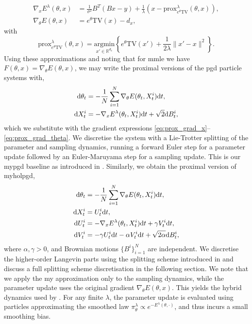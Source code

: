 \begin{align}
    \nabla_xE^\lambda(\theta,x)&=\frac{1}{\sigma^2}B^T(Bx-y)+\frac{1}{\lambda}\left(x-\mathrm{prox}^\lambda_{e^\theta\mathrm{TV}}(\theta,x)\right),\label{eq:prox_grad_x}\\
    \nabla_\theta E(\theta,x)&=e^\theta\mathrm{TV}(x)-d_x,\label{eq:prox_grad_theta}
\end{align}
with
\begin{equation*}
    \mathrm{prox}^\lambda_{e^\theta\mathrm{TV}}(\theta,x)=\underset{x'\in\mathbb{R}^{d_x}}{\mathrm{argmin}}\left\{e^\theta\mathrm{TV}(x')+\frac{1}{2\lambda}\|x'-x\|^2\right\}.
\end{equation*}
Using these approximations and noting that for \gls*{mmle} we have $F(\theta,x)=\nabla_\theta E(\theta,x)$, we may write the proximal versions of the \gls*{pgd} particle systems with,
\begin{equation*}
    \begin{aligned}
        \mathrm{d} \theta_t&=-\frac{1}{N}\sum_{i=1}^N\nabla_\theta E(\theta_t,X^i_t)\mathrm{d} t,\\
        \mathrm{d} X^i_t&=-\nabla_xE^\lambda(\theta_t,X^i_t)\mathrm{d} t+\sqrt{2}\mathrm{d} B_t^i,
    \end{aligned}
\end{equation*}
which we substitute with the gradient expressions \eqref{eq:prox_grad_x}--\eqref{eq:prox_grad_theta}. We discretise the system with a Lie-Trotter splitting of the parameter and sampling dynamics, running a forward Euler step for a parameter update followed by an Euler-Maruyama step for a sampling update. This is our \gls*{mypgd} baseline as introduced in \citet{encinar2025proximal}. Similarly, we obtain the proximal version of \gls*{myholpgd},
\begin{equation*}\label{eq:high_order_langevin_scheme_proximal}
    \begin{aligned}
        \mathrm{d} \theta_t&=-\frac{1}{N}\sum_{i=1}^N\nabla_\theta E(\theta_t,X^i_t)\mathrm{d} t,\\
        \mathrm{d} X^i_t&=U^i_t\mathrm{d} t,\\
        \mathrm{d} U^i_t&=-\nabla_xE^\lambda(\theta_t,X^i_t)\mathrm{d} t+\gamma V_t^i\mathrm{d} t,\\
        \mathrm{d} V^i_t&=-\gamma U^i_t\mathrm{d} t-\alpha V^i_t\mathrm{d} t+\sqrt{2\alpha}\mathrm{d} B^i_t,
    \end{aligned}
\end{equation*}
where $\alpha,\gamma>0$, and Brownian motions $\{B^i\}^N_{i=1}$ are independent. We discretise the higher-order Langevin parts using the splitting scheme introduced in \citet{high_order_langevin_JMLR} and discuss a full splitting scheme discretisation in the following section. We note that we apply the \gls*{my} approximation only to the sampling dynamics, while the parameter update uses the original gradient $\nabla_\theta E(\theta,x)$. This yields the hybrid dynamics used by \citet{encinar2025proximal}. For any finite $\lambda$, the parameter update is evaluated using particles approximating the smoothed law $\pi_\theta^\lambda\propto e^{-E^\lambda(\theta,\cdot)}$, and thus incurs a small smoothing bias.

